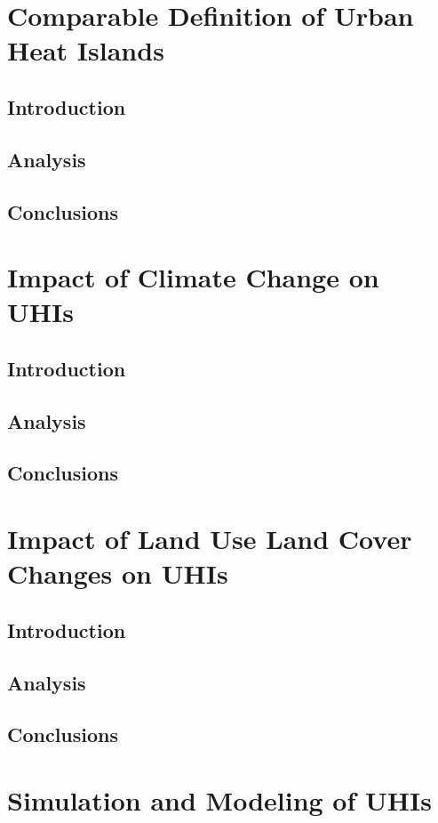 \documentclass[a4paper, english]{article}
\begin{document}
\section{Comparable Definition of Urban Heat Islands}
    \subsection{Introduction}
    \subsection{Analysis}
    \subsection{Conclusions}

\section{Impact of Climate Change on UHIs}
    \subsection{Introduction}
    \subsection{Analysis}
    \subsection{Conclusions}

\section{Impact of Land Use Land Cover Changes on UHIs}
    \subsection{Introduction}
    \subsection{Analysis}
    \subsection{Conclusions}

\section{Simulation and Modeling of UHIs}
\end{document}
